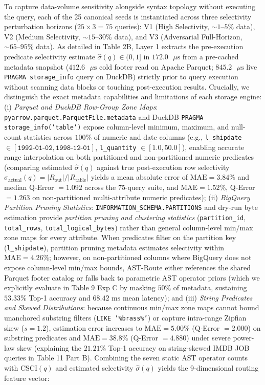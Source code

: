 \documentclass[10pt,a4paper]{article}
\begin{document}
To capture data-volume sensitivity alongside syntax topology without executing the query, each of the 25 canonical seeds is instantiated across three selectivity perturbation horizons ($25 \times 3 = 75$ queries): V1 (High Selectivity, $\sim 1\text{--}5\%$ data), V2 (Medium Selectivity, $\sim 15\text{--}30\%$ data), and V3 (Adversarial Full-Horizon, $\sim 65\text{--}95\%$ data). As detailed in Table 2B, Layer 1 extracts the pre-execution predicate selectivity estimate $\hat{\sigma}(q) \in (0, 1]$ in $172.0\text{ }\mu\text{s}$ from a pre-cached metadata snapshot ($412.6\text{ }\mu\text{s}$ cold footer read on Apache Parquet; $845.2\text{ }\mu\text{s}$ live \texttt{PRAGMA storage\_info} query on DuckDB) strictly prior to query execution without scanning data blocks or touching post-execution results. Crucially, we distinguish the exact metadata capabilities and limitations of each storage engine: (i) \emph{Parquet and DuckDB Row-Group Zone Maps}: \texttt{pyarrow.parquet.ParquetFile.metadata} and DuckDB \texttt{PRAGMA storage\_info('table')} expose column-level minimum, maximum, and null-count statistics across $100\%$ of numeric and date columns (e.g., \texttt{l\_shipdate} $\in [\texttt{1992-01-02}, \texttt{1998-12-01}]$, \texttt{l\_quantity} $\in [1.0, 50.0]$), enabling accurate range interpolation on both partitioned and non-partitioned numeric predicates (comparing estimated $\hat{\sigma}(q)$ against true post-execution row selectivity $\sigma_{\text{actual}}(q) = |R_{\text{out}}|/|R_{\text{table}}|$ yields a mean absolute error of $\text{MAE}=3.84\%$ and median Q-Error $=1.092$ across the 75-query suite, and $\text{MAE}=1.52\%$, Q-Error $=1.263$ on non-partitioned multi-attribute numeric predicates); (ii) \emph{BigQuery Partition Pruning Statistics}: \texttt{INFORMATION\_SCHEMA.PARTITIONS} and dry-run byte estimation provide \emph{partition pruning and clustering statistics} (\texttt{partition\_id}, \texttt{total\_rows}, \texttt{total\_logical\_bytes}) rather than general column-level min/max zone maps for every attribute. When predicates filter on the partition key (\texttt{l\_shipdate}), partition pruning metadata estimates selectivity within $\text{MAE}=4.26\%$; however, on non-partitioned columns where BigQuery does not expose column-level min/max bounds, AST-Route either references the shared Parquet footer catalog or falls back to parametric AST operator priors (which we explicitly evaluate in Table 9 Exp C by masking $50\%$ of metadata, sustaining $53.33\%$ Top-1 accuracy and $68.42\text{ ms}$ mean latency); and (iii) \emph{String Predicates and Skewed Distributions}: because continuous min/max zone maps cannot bound unanchored substring filters (\texttt{LIKE '\%brass\%'}) or capture intra-range Zipfian skew ($s=1.2$), estimation error increases to $\text{MAE}=5.00\%$ (Q-Error $=2.000$) on substring predicates and $\text{MAE}=38.8\%$ (Q-Error $=4.880$) under severe power-law skew (explaining the $21.21\%$ Top-1 accuracy on string-skewed IMDB JOB queries in Table 11 Part B). Combining the seven static AST operator counts with $\text{CSCI}(q)$ and estimated selectivity $\hat{\sigma}(q)$ yields the 9-dimensional routing feature vector:
\end{document}
